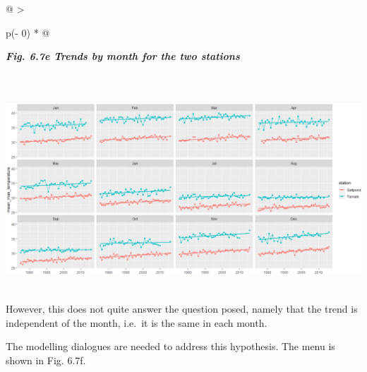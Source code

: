\documentclass[
  letterpaper,
  DIV=11,
  numbers=noendperiod]{scrreprt}
\begin{document}
\begin{longtable}[]{@{}
  >{\raggedright\arraybackslash}p{(\columnwidth - 0\tabcolsep) * }@{}}
\toprule\noalign{}
\begin{minipage}[b]{\linewidth}\raggedright
\textbf{\emph{Fig. 6.7e Trends by month for the two stations}}
\end{minipage} \\
\midrule\noalign{}
\endhead
\bottomrule\noalign{}
\endlastfoot
\includegraphics[width=6.11982in,height=2.97923in]{figures/Fig6.7e.png} \\
\end{longtable}

However, this does not quite answer the question posed, namely that the
trend is independent of the month, i.e.~it is the same in each month.

The modelling dialogues are needed to address this hypothesis. The menu
is shown in Fig. 6.7f.
\end{document}
